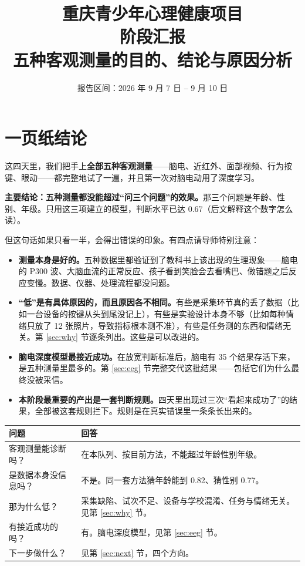 \documentclass[UTF8,12pt,a4paper]{ctexart}
\title{\textbf{重庆青少年心理健康项目}\\[0.5em]阶段汇报\\[0.4em]\large 五种客观测量的目的、结论与原因分析}
\author{}
\date{报告区间：2026 年 9 月 7 日 -- 9 月 10 日}
\newcommand{\key}[1]{\textbf{\textcolor{blue!45!black}{#1}}}
\begin{document}
\maketitle
\thispagestyle{fancy}

\section*{一页纸结论}

这四天里，我们把手上\key{全部五种客观测量}——脑电、近红外、面部视频、行为按键、眼动——都完整地试了一遍，并且第一次对脑电动用了深度学习。

\key{主要结论：五种测量都没能超过“问三个问题”的效果。}那三个问题是年龄、性别、年级。只用这三项建立的模型，判断水平已达 0.67（后文解释这个数字怎么读）。

但这句话如果只看一半，会得出错误的印象。有四点请导师特别注意：

\begin{itemize}
\item \key{测量本身是好的。}五种数据里都验证到了教科书上该出现的生理现象——脑电的 P300 波、大脑血流的正常反应、孩子看到笑脸会去看嘴巴、做错题之后反应变慢。数据、仪器、处理流程都没问题。

\item \key{“低”是有具体原因的，而且原因各不相同。}有些是采集环节真的丢了数据（比如一台设备的按键从头到尾没记上），有些是实验设计本身不够（比如每种情绪只放了 12 张照片，导致指标根本测不准），有些是任务测的东西和情绪无关。第 \ref{sec:why} 节逐条列出。这些是可以改进的。

\item \key{脑电深度模型最接近成功。}在放宽判断标准后，脑电有 35 个结果存活下来，是五种测量里最多的。第 \ref{sec:eeg} 节完整交代这批结果——包括它们为什么最终没被采信。

\item \key{本阶段最重要的产出是一套判断规则。}四天里出现过三次“看起来成功了”的结果，全部被这套规则拦下。规则是在真实错误里一条条长出来的。
\end{itemize}

\vspace{0.5em}
\begin{center}
\begin{tabularx}{\textwidth}{@{}lY@{}}
\toprule
\textbf{问题} & \textbf{回答} \\
\midrule
客观测量能诊断吗？ & 在本队列、按目前方法，不能超过年龄性别年级。 \\
是数据本身没信息吗？ & 不是。同一套方法猜年龄能到 0.82、猜性别 0.77。 \\
那为什么低？ & 采集缺陷、试次不足、设备与学校混淆、任务与情绪无关。见第 \ref{sec:why} 节。 \\
有接近成功的吗？ & 有。脑电深度模型，见第 \ref{sec:eeg} 节。 \\
下一步做什么？ & 见第 \ref{sec:next} 节，四个方向。 \\
\bottomrule
\end{tabularx}
\end{center}
\end{document}
